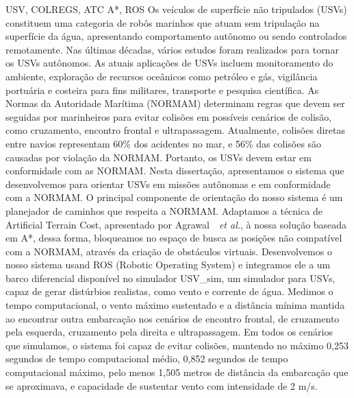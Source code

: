 \documentclass[english]{pucrs-ppgcc}
\newcommand{\etal}{{\it et al.}}
\begin{document}
\begin{resumo}{USV, COLREGS, ATC A*, ROS}
Os veículos de superfície não tripulados (USVs) constituem uma categoria de robôs marinhos que atuam sem tripulação na superfície da água, apresentando comportamento autônomo ou sendo controlados remotamente. 
Nas últimas décadas, vários estudos foram realizados para tornar os USVs autônomos. As atuais aplicações de USVs incluem monitoramento do ambiente, exploração de recursos oceânicos como petróleo e gás, vigilância portuária e costeira para fins militares, transporte e pesquisa científica. 
As Normas da Autoridade Marítima (NORMAM) determinam regras que devem ser seguidas por marinheiros para evitar colisões em possíveis cenários de colisão, como cruzamento, encontro frontal e ultrapassagem. 
Atualmente, colisões diretas entre navios representam 60\% dos acidentes no mar, e 56\% das colisões são causadas por violação da NORMAM. Portanto, os USVs devem estar em conformidade com as NORMAM. 
Nesta dissertação, apresentamos o sistema que desenvolvemos para orientar USVs em missões autônomas e em conformidade com a NORMAM. 
O principal componente de orientação do nosso sistema é um planejador de caminhos que respeita a NORMAM. 
Adaptamos a técnica de Artificial Terrain Cost, apresentado por Agrawal~\cite{Agrawal2015COLREGS}~\etal, à nossa solução baseada em A*, dessa forma, bloqueamos no espaço de busca as posições não compatível com a NORMAM, através da criação de obstáculos virtuais. 
Desenvolvemos o nosso sistema usand ROS (Robotic Operating System) e integramos ele a um barco diferencial disponível no simulador USV\_sim, um simulador para USVs, capaz de gerar distúrbios realistas, como vento e corrente de água. Medimos o tempo computacional, o vento máximo sustentado e a distância mínima mantida ao encontrar outra embarcação nos cenários de encontro frontal, de cruzamento pela esquerda, cruzamento pela direita e ultrapassagem.
Em todos os cenários que simulamos, o sistema foi capaz de evitar colisões, mantendo no máximo 0,253 segundos de tempo computacional médio, 0,852 segundos de tempo computacional máximo, pelo menos 1,505 metros de distância da embarcação que se aproximava, e capacidade de sustentar vento com intensidade de 2 m/s.
\end{resumo}
\end{document}
